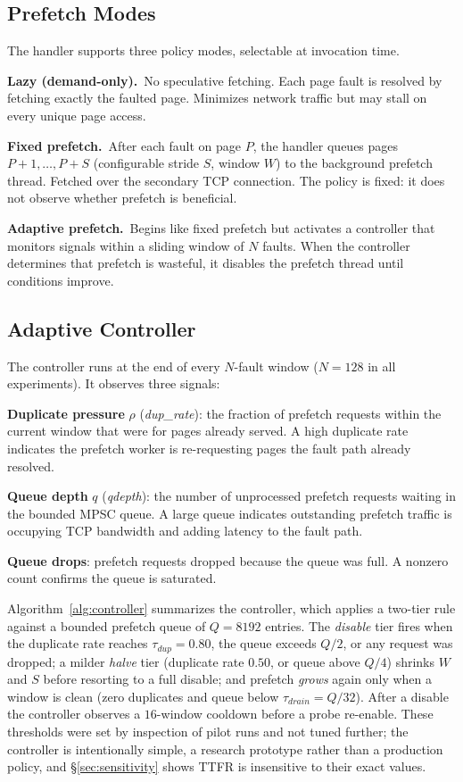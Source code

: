 \documentclass[journal]{IEEEtran}
\newcommand{\dupthr}{\ensuremath{\tau_\textit{dup}}}
\newcommand{\drainthr}{\ensuremath{\tau_\textit{drain}}}
\begin{document}
\subsection{Prefetch Modes}

The handler supports three policy modes, selectable at invocation time.

\textbf{Lazy (demand-only).}\, No speculative fetching. Each page fault is
resolved by fetching exactly the faulted page. Minimizes network traffic but
may stall on every unique page access.

\textbf{Fixed prefetch.}\, After each fault on page $P$, the handler queues
pages $P{+}1, \ldots, P{+}S$ (configurable stride $S$, window $W$) to the
background prefetch thread. Fetched over the secondary TCP connection. The
policy is fixed: it does not observe whether prefetch is beneficial.

\textbf{Adaptive prefetch.}\, Begins like fixed prefetch but activates a
controller that monitors signals within a sliding window of $N$ faults.
When the controller determines that prefetch is wasteful, it disables the
prefetch thread until conditions improve.

\subsection{Adaptive Controller}
\label{sec:controller}

The controller runs at the end of every $N$-fault window ($N\!=\!128$ in
all experiments). It observes three signals:

\textbf{Duplicate pressure} $\rho$ (\textit{dup\_rate}): the fraction of
prefetch requests within the current window that were for pages already
served. A high duplicate rate indicates the prefetch worker is re-requesting
pages the fault path already resolved.

\textbf{Queue depth} $q$ (\textit{qdepth}): the number of unprocessed
prefetch requests waiting in the bounded MPSC queue. A large queue
indicates outstanding prefetch traffic is occupying TCP bandwidth and
adding latency to the fault path.

\textbf{Queue drops}: prefetch requests dropped because the queue was full.
A nonzero count confirms the queue is saturated.

Algorithm~\ref{alg:controller} summarizes the controller, which applies a
two-tier rule against a bounded prefetch queue of $Q\!=\!8192$ entries.
The \emph{disable} tier fires when the duplicate rate reaches
$\dupthr\!=\!0.80$, the queue exceeds $Q/2$, or any request was dropped; a
milder \emph{halve} tier (duplicate rate $0.50$, or queue above $Q/4$)
shrinks $W$ and $S$ before resorting to a full disable; and prefetch
\emph{grows} again only when a window is clean (zero duplicates and queue
below $\drainthr\!=\!Q/32$). After a disable the controller observes a
$16$-window cooldown before a probe re-enable. These thresholds were set by
inspection of pilot runs and not tuned further; the controller is
intentionally simple, a research prototype rather than a production policy,
and \S\ref{sec:sensitivity} shows TTFR is insensitive to their exact
values.
\end{document}
